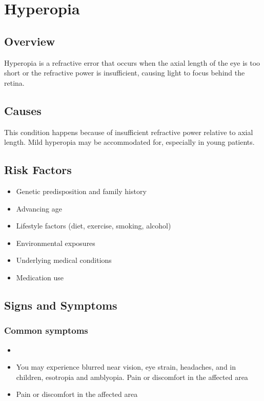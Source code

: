 \chapter{Hyperopia}
\label{sec:Hyperopia}

\section{Overview}
Hyperopia is a refractive error that occurs when the axial length of the eye is too short or the refractive power is insufficient, causing light to focus behind the retina.
\section{Causes}
This condition happens because of insufficient refractive power relative to axial length. Mild hyperopia may be accommodated for, especially in young patients.     
\section{Risk Factors}

\begin{itemize}[noitemsep]
  \item Genetic predisposition and family history
  \item Advancing age
  \item Lifestyle factors (diet, exercise, smoking, alcohol)
  \item Environmental exposures
  \item Underlying medical conditions
  \item Medication use
\end{itemize}
\section{Signs and Symptoms}

\subsection{Common symptoms}
\begin{itemize}[noitemsep]
  \item \item You may experience blurred near vision, eye strain, headaches, and in children, esotropia and amblyopia. Pain or discomfort in the affected area    \item Pain or discomfort in the affected area
  \end{itemize}

